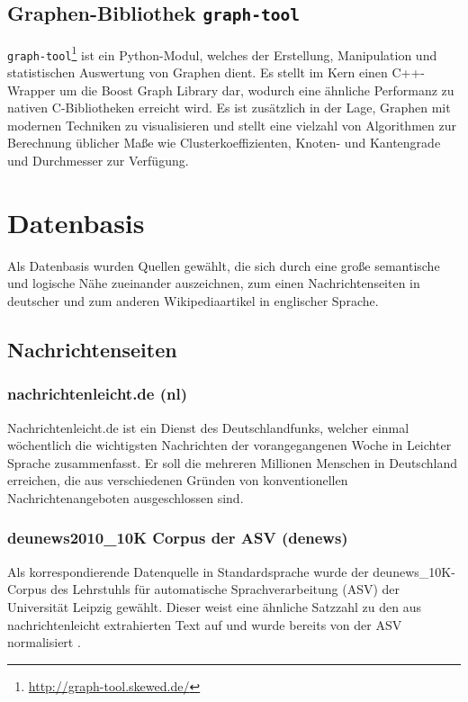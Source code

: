 \documentclass[11pt, a4paper]{article}
\begin{document}
\subsection{Graphen-Bibliothek \texttt{graph-tool}}
\texttt{graph-tool}\footnote{\url{http://graph-tool.skewed.de/}} ist ein
Python-Modul, welches der Erstellung, Manipulation und statistischen
Auswertung von Graphen dient. Es stellt im Kern einen C++-Wrapper um die Boost
Graph Library dar, wodurch eine \"ahnliche Performanz zu nativen C-Bibliotheken
erreicht wird. Es ist zus\"atzlich in der Lage, Graphen mit modernen Techniken
zu visualisieren und stellt eine vielzahl von Algorithmen zur Berechnung  
\"ublicher Ma\ss{}e wie Clusterkoeffizienten, Knoten- und Kantengrade und
 Durchmesser zur Verfügung.


\section{Datenbasis}
\label{sec:datenbasis}

Als Datenbasis wurden Quellen gew\"ahlt, die sich durch eine gro\ss{}e
semantische und logische N\"ahe zueinander auszeichnen, zum einen
Nachrichtenseiten in deutscher und zum anderen Wikipediaartikel in
 englischer Sprache.

\subsection{Nachrichtenseiten}
\label{nrseiten}

\subsubsection{nachrichtenleicht.de (nl)}

Nachrichtenleicht.de ist ein Dienst des Deutschlandfunks, welcher einmal
w\"ochentlich die wichtigsten Nachrichten der vorangegangenen Woche in Leichter
Sprache zusammenfasst. Er soll die mehreren Millionen Menschen in Deutschland
erreichen, die aus verschiedenen Gr\"unden von konventionellen
Nachrichtenangeboten ausgeschlossen sind.

\subsubsection{deunews2010\_10K Corpus der ASV (denews)}

Als korrespondierende Datenquelle in Standardsprache wurde der
deunews\_10K-Corpus des Lehrstuhls f\"ur automatische Sprachverarbeitung
(ASV) der Universit\"at Leipzig gew\"ahlt. Dieser weist eine \"ahnliche Satzzahl
zu den aus nachrichtenleicht extrahierten Text auf und wurde bereits von der ASV
normalisiert \cite{Quasthoff2006}.
\end{document}
